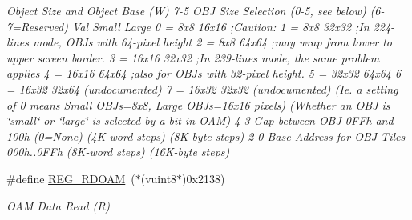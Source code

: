 \begin{DoxyCompactItemize}
\begin{DoxyCompactList}\small\item\em Object Size and Object Base (W) 7-\/5 O\+BJ Size Selection (0-\/5, see below) (6-\/7=Reserved) Val Small Large 0 = 8x8 16x16 ;Caution\+: 1 = 8x8 32x32 ;In 224-\/lines mode, O\+B\+Js with 64-\/pixel height 2 = 8x8 64x64 ;may wrap from lower to upper screen border. 3 = 16x16 32x32 ;In 239-\/lines mode, the same problem applies 4 = 16x16 64x64 ;also for O\+B\+Js with 32-\/pixel height. 5 = 32x32 64x64 6 = 16x32 32x64 (undocumented) 7 = 16x32 32x32 (undocumented) (Ie. a setting of 0 means Small O\+B\+Js=8x8, Large O\+B\+Js=16x16 pixels) (Whether an O\+BJ is \char`\"{}small\char`\"{} or \char`\"{}large\char`\"{} is selected by a bit in O\+AM) 4-\/3 Gap between O\+BJ 0\+F\+Fh and 100h (0=None) (4\+K-\/word steps) (8\+K-\/byte steps) 2-\/0 Base Address for O\+BJ Tiles 000h..0\+F\+Fh (8\+K-\/word steps) (16\+K-\/byte steps) \end{DoxyCompactList}\item 
\mbox{\label{a00365_ac815cf72d6b31fb9e38042a0eacee023}} 
\#define \hyperlink{a00365_ac815cf72d6b31fb9e38042a0eacee023}{R\+E\+G\+\_\+\+R\+D\+O\+AM}~($\ast$(vuint8$\ast$)0x2138)
\begin{DoxyCompactList}\small\item\em O\+AM Data Read (R) \end{DoxyCompactList}\end{DoxyCompactItemize}
